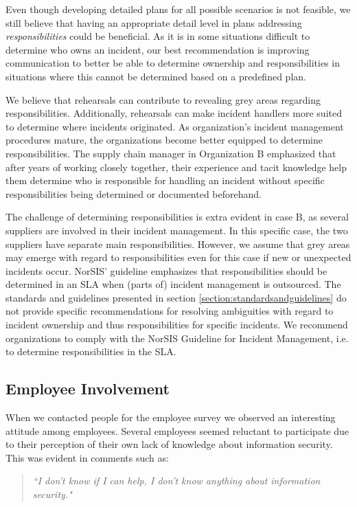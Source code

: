 Even though developing detailed plans for all possible scenarios is not feasible, we still believe that having an appropriate detail level in plans addressing \textit{responsibilities} could be beneficial. As it is in some situations difficult to determine who owns an incident, our best recommendation is improving communication to better be able to determine ownership and responsibilities in situations where this cannot be determined based on a predefined plan.

We believe that rehearsals can contribute to revealing grey areas regarding responsibilities. Additionally, rehearsals can make incident handlers more suited to determine where incidents originated. As organization's incident management procedures mature, the organizations become better equipped to determine responsibilities. The supply chain manager in Organization B emphasized that after years of working closely together, their experience and tacit knowledge help them determine who is responsible for handling an incident without specific responsibilities being determined or documented beforehand. 

The challenge of determining responsibilities is extra evident in case B, as several suppliers are involved in their incident management. In this specific case, the two suppliers have separate main responsibilities. However, we assume that grey areas may emerge with regard to responsibilities even for this case if new or unexpected incidents occur. NorSIS' guideline emphasizes that responsibilities should be determined in an SLA when (parts of) incident management is outsourced. The standards and guidelines presented in section \ref{section:standardsandguidelines} do not provide specific recommendations for resolving ambiguities with regard to incident ownership and thus responsibilities for specific incidents. We recommend organizations to comply with the NorSIS Guideline for Incident Management, i.e. to determine responsibilities in the \ac{SLA}.


\subsection{Employee Involvement}
When we contacted people for the employee survey we observed an interesting attitude among employees. Several employees seemed reluctant to participate due to their perception of their own lack of knowledge about information security. This was evident in comments such as:

\begin{quote}
\textit{``I don't know if I can help, I don't know anything about information security."}
\end{quote}

